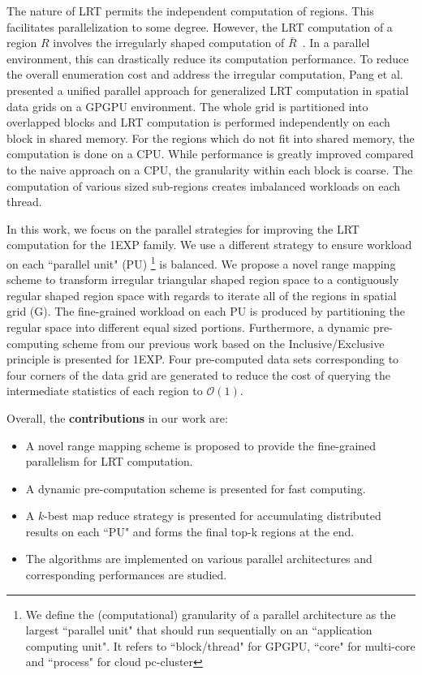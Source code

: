 \documentclass[AMA,LATO1COL]{WileyNJD-v2}
\newcommand\bigo{\mathcal O}
\begin{document}
\noindent The nature of LRT permits the independent computation of regions. This facilitates parallelization to some degree. However, the LRT computation of a region $R$ involves the irregularly shaped computation of $\bar R$~\cite{apweb}. In a parallel environment, this can drastically reduce its computation performance\cite{irregular1,irregular2,irregular3}.
To reduce the overall enumeration cost and address the irregular computation, Pang et al.~\cite{apweb} presented a unified parallel approach for generalized LRT computation in spatial data grids on a GPGPU environment. The whole grid is partitioned into overlapped blocks and LRT computation is performed independently on each block in shared memory. For the regions which do not fit into shared memory, the computation is done on a CPU. While performance is greatly improved compared to the naive approach on a CPU, the granularity within each block is coarse. The computation of various sized sub-regions creates imbalanced workloads on each thread.

\noindent In this work, we focus on the parallel strategies for improving the LRT computation for the 1EXP family. We use a different strategy to ensure workload on each ``parallel unit" (PU) \footnote{We define the (computational) granularity of a parallel architecture as the largest ``parallel unit" that should run sequentially on an ``application computing unit". It refers to ``block/thread" for GPGPU, ``core" for multi-core and ``process" for cloud pc-cluster} is balanced. We propose a novel range mapping scheme to transform irregular triangular shaped region space to a contiguously regular shaped region space with regards to iterate all of the regions in spatial grid (G). The fine-grained workload on each PU is produced by partitioning the regular space into different equal sized portions. Furthermore, a dynamic pre-computing scheme from our previous work\cite{apweb} based on the Inclusive/Exclusive principle is presented for 1EXP. Four pre-computed data sets corresponding to four corners of the data grid are generated to reduce the cost of querying the intermediate statistics of each region to $\bigo(1)$.

Overall, the {\bf contributions} in our work are:
\begin{itemize}
\renewcommand{\labelitemi}{$\bullet$}
\item A novel range mapping scheme is proposed to provide the fine-grained parallelism for LRT computation.
\item A dynamic pre-computation scheme is presented for fast computing.
\item A $k$-best map reduce strategy is presented for accumulating distributed results on each ``PU" and forms the final top-k regions at the end.
\item The algorithms are implemented on various parallel architectures and corresponding performances are studied.
\end{itemize}
\end{document}
